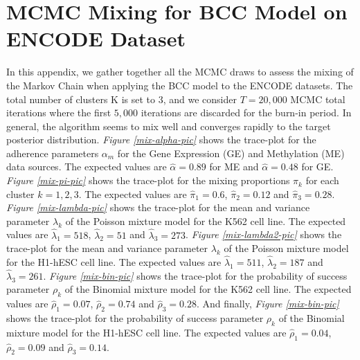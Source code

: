 \chapter{MCMC Mixing for BCC Model on ENCODE Dataset} \label{app-mcmc-mixing-chapter}
In this appendix, we gather together all the MCMC draws to assess the mixing of the Markov Chain when applying the BCC model to the ENCODE datasets. The total number of clusters K is set to 3, and we consider $T=20,000$ MCMC total iterations where the first $5,000$ iterations are discarded for the burn-in period. In general, the algorithm seems to mix well and converges rapidly to the target posterior distribution. \emph{Figure \ref{mix-alpha-pic}} shows the trace-plot for the adherence parameters $\alpha_{m}$ for the Gene Expression (GE) and Methylation (ME) data sources. The expected values are $\hat{\alpha} = 0.89$ for ME and $\hat{\alpha} = 0.48$ for GE. \emph{Figure \ref{mix-pi-pic}} shows the trace-plot for the mixing proportions $\pi_{k}$ for each cluster $k=1,2,3$. The expected values are $\hat{\pi}_{1}=0.6$, $\hat{\pi}_{2}=0.12$ and $\hat{\pi}_{3}=0.28$. \emph{Figure \ref{mix-lambda-pic}} shows the trace-plot for the mean and variance parameter $\lambda_{k}$ of the Poisson mixture model for the K562 cell line. The expected values are $\hat{\lambda}_{1}=518$, $\hat{\lambda}_{2}=51$ and $\hat{\lambda}_{3}=273$. \emph{Figure \ref{mix-lambda2-pic}} shows the trace-plot for the mean and variance parameter $\lambda_{k}$ of the Poisson mixture model for the H1-hESC cell line. The expected values are $\hat{\lambda}_{1}=511$, $\hat{\lambda}_{2}=187$ and $\hat{\lambda}_{3}=261$. \emph{Figure \ref{mix-bin-pic}} shows the trace-plot for the probability of success parameter $\rho_{k}$ of the Binomial mixture model for the K562 cell line. The expected values are $\hat{\rho}_{1}=0.07$, $\hat{\rho}_{2}=0.74$ and $\hat{\rho}_{3}=0.28$. And finally, \emph{Figure \ref{mix-bin-pic}} shows the trace-plot for the probability of success parameter $\rho_{k}$ of the Binomial mixture model for the H1-hESC cell line. The expected values are $\hat{\rho}_{1}=0.04$, $\hat{\rho}_{2}=0.09$ and $\hat{\rho}_{3}=0.14$.

